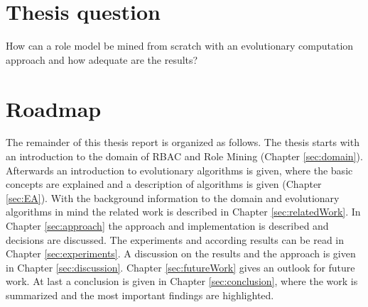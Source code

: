 \section{Thesis question}
How can a role model be mined from scratch with an evolutionary computation approach and how adequate are the results?

\section{Roadmap}
The remainder of this thesis report is organized as follows. The thesis starts with an introduction to the domain of RBAC and Role Mining (Chapter \ref{sec:domain}). Afterwards an introduction to evolutionary algorithms is given, where the basic concepts are explained and a description of algorithms is given (Chapter \ref{sec:EA}). With the background information to the domain and evolutionary algorithms in mind the related work is described in Chapter \ref{sec:relatedWork}. In Chapter \ref{sec:approach} the approach and implementation is described and decisions are discussed. The experiments and according results can be read in Chapter \ref{sec:experiments}. A discussion on the results and the approach is given in Chapter \ref{sec:discussion}. Chapter \ref{sec:futureWork} gives an outlook for future work. At last a conclusion is given in Chapter \ref{sec:conclusion}, where the work is summarized and the most important findings are highlighted.